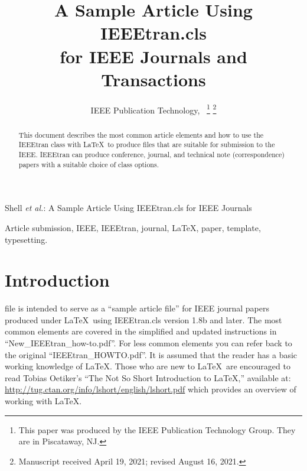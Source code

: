 \documentclass[lettersize,journal]{IEEEtran}
\begin{document}
 \title{A Sample Article Using IEEEtran.cls\\ for IEEE Journals and Transactions}

 \author{IEEE Publication Technology,~
 \thanks{This paper was produced by the IEEE Publication Technology Group. They are in Piscataway, NJ.}%
 \thanks{Manuscript received April 19, 2021; revised August 16, 2021.}}

 {Shell \MakeLowercase{\textit{et al.}}: A Sample Article Using IEEEtran.cls for IEEE Journals}


 \maketitle

 \begin{abstract}
  This document describes the most common article elements and how to use the IEEEtran class with \LaTeX \ to produce files that are suitable for submission to the IEEE.  IEEEtran can produce conference, journal, and technical note (correspondence) papers with a suitable choice of class options.
 \end{abstract}

 \begin{IEEEkeywords}
  Article submission, IEEE, IEEEtran, journal, \LaTeX, paper, template, typesetting.
 \end{IEEEkeywords}

 \section{Introduction}
  file is intended to serve as a ``sample article file''
 for IEEE journal papers produced under \LaTeX\ using
 IEEEtran.cls version 1.8b and later. The most common elements are covered in the simplified and updated instructions in ``New\_IEEEtran\_how-to.pdf''. For less common elements you can refer back to the original ``IEEEtran\_HOWTO.pdf''. It is assumed that the reader has a basic working knowledge of \LaTeX. Those who are new to \LaTeX \ are encouraged to read Tobias Oetiker's ``The Not So Short Introduction to \LaTeX ,'' available at: \url{http://tug.ctan.org/info/lshort/english/lshort.pdf} which provides an overview of working with \LaTeX.
\end{document}
